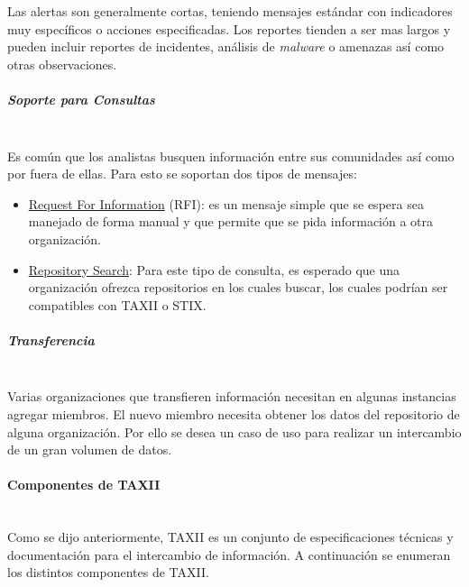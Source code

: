 Las alertas son generalmente cortas, teniendo mensajes estándar con indicadores 
muy específicos o acciones especificadas. Los reportes tienden a ser mas largos 
y pueden incluir reportes de incidentes, análisis de \textit{malware} o amenazas así como 
otras observaciones.

\subparagraph{Soporte para Consultas}\ \\

Es común que los analistas busquen información entre sus comunidades así como 
por fuera de ellas. Para esto se soportan dos tipos de mensajes:
\begin{itemize}
  \item \underline{Request For Information} (RFI): es un mensaje simple que se espera sea 
  manejado de forma manual y que permite que se pida información a otra 
  organización.
  \item \underline{Repository Search}: Para este tipo de consulta, es esperado que una 
  organización ofrezca repositorios en los cuales buscar, los cuales podrían ser 
  compatibles con TAXII o STIX.
\end{itemize}
\bigskip

\subparagraph{Transferencia}\ \\

Varias organizaciones que transfieren información necesitan en algunas 
instancias agregar miembros. El nuevo miembro necesita obtener los datos del 
repositorio de alguna organización. Por ello se desea un caso de uso para 
realizar un intercambio de un gran volumen de datos.

\paragraph{Componentes de TAXII}\ \\

Como se dijo anteriormente, TAXII es un conjunto de especificaciones técnicas y 
documentación para el intercambio de información. A continuación se enumeran los 
distintos componentes de TAXII.

